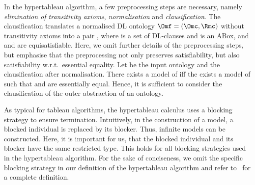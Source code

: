 In the hypertableau algorithm, a few preprocessing steps are necessary, namely \emph{elimination of
  transitivity axioms}, \emph{normalisation} and \emph{clausification}. The clausification
translates a normalised DL ontology $\Omf = (\Omc, \Rmc)$ without transitivity axioms into a pair
\CA, where \Cmc is a set of DL-clauses and \A is an ABox, and \Omf and \CA are equisatisfiable.
Here, we omit further details of the preprocessing steps, but emphasise that the preprocessing not
only preserves satisfiability, but also satisfiability w.r.t.~essential equality.  Let \Kmc be the
input ontology and \CA the clausification after normalisation. There exists a model \I of \Kmc iff
the exists a model \Hmc of \CA such that \I and \Hmc are essentially equal. Hence, it is sufficient
to consider the clausification of the outer abstraction of an \LMLO ontology.

As typical for tableau algorithms, the hypertableau calculus uses a blocking strategy to ensure
termination. Intuitively, in the construction of a model, a blocked individual is replaced by its
blocker. Thus, infinite models can be constructed. Here, it is important for us, that the blocked
individual and its blocker have the same restricted type. This holds for all blocking strategies
used in the hypertableau algorithm. For the sake of conciseness, we omit the specific blocking
strategy in our definition of the hypertableau algorithm and refer to~\cite{MoSH-JAIR09} for a
complete definition.

